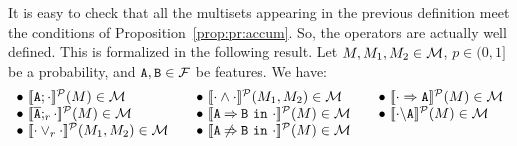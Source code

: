 

It is easy to check that all the multisets appearing in the previous
definition meet the conditions of Proposition~\ref{prop:pr:accum}. So,
the operators are actually well defined. This is formalized in the
following result.
\bprop\label{prp:domain:prob}
  Let  $M,M_{1}, M_{2}\in{\cal M}$,
  $p\in(0,1]$ be a probability, and
  $\mathtt{A},\mathtt{B}\in{\cal F}$ be features. We have:
$$ \begin{array}{lllll}
\bullet\ \semdenp{\feature{A};\cdot}(M)\in\calM & &
\bullet\ \semdenp{\cdot\paral\cdot}(M_{1},M_{2})\in\calM& &
\bullet\ \semdenp{\mandatory{A}{\cdot}}(M)\in\calM\\
\bullet\ \semdenp{\ofeature{A};_{r}\cdot}(M)\in\calM& &
\bullet\ \semdenp{\require{A}{B}{\cdot}}(M)\in\calM& &
\bullet\ \semdenp{\forbid{A}{\cdot}}(M)\in\calM\\
\bullet\ \semdenp{\cdot\choice_{r}\cdot}(M_{1},M_{2})\in\calM& &
\bullet\ \semdenp{\exclude{A}{B}{\cdot}}(M)\in\calM
  \end{array}$$
\eprop





